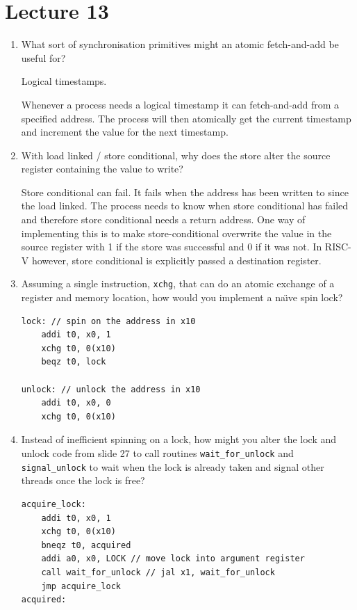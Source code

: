 \documentclass[10pt,\jkfside,a4paper]{article}
\begin{document}
\section{Lecture 13}

\begin{enumerate}

\item What sort of synchronisation primitives might an atomic fetch-and-add be
useful for?

Logical timestamps.

Whenever a process needs a logical timestamp it can fetch-and-add from a
specified address. The process will then atomically get the current
timestamp and increment the value for the next timestamp.

\item With load linked / store conditional, why does the store alter the
source register containing the value to write?

Store conditional can fail. It fails when the address has been written to
since the load linked. The process needs to know when store conditional has
failed and therefore store conditional needs a return address. One way of
implementing this is to make store-conditional overwrite the value in the
source register with 1 if the store was successful and 0 if it was not. In
RISC-V however, store conditional is explicitly passed a destination register.

\item Assuming a single instruction, \texttt{xchg}, that can do an atomic
exchange of a register and memory location, how would you implement a
na\"{\i}ve spin lock?

\begin{lstlisting}
lock: // spin on the address in x10
	addi t0, x0, 1
	xchg t0, 0(x10)
	beqz t0, lock

unlock: // unlock the address in x10
	addi t0, x0, 0
	xchg t0, 0(x10)
\end{lstlisting}

\item Instead of inefficient spinning on a lock, how might you alter the
lock and unlock code from slide 27 to call routines \texttt{wait\_for\_unlock}
and \texttt{signal\_unlock} to wait when the lock is already taken and
signal other threads once the lock is free?

\begin{lstlisting}
acquire_lock:
	addi t0, x0, 1
	xchg t0, 0(x10)
	bneqz t0, acquired
	addi a0, x0, LOCK // move lock into argument register
	call wait_for_unlock // jal x1, wait_for_unlock
	jmp acquire_lock
acquired:


\end{lstlisting}
\end{enumerate}
\end{document}
